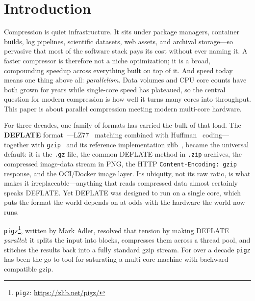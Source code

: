 \documentclass{pigzpp-whitepaper}
\begin{document}
\section{Introduction}
Compression is quiet infrastructure. It sits under package managers, container
builds, log pipelines, scientific datasets, web assets, and archival storage---so
pervasive that most of the software stack pays its cost without ever naming it.
A faster compressor is therefore not a niche optimization; it is a broad,
compounding speedup across everything built on top of it. And speed today means
one thing above all: \emph{parallelism}. Data volumes and CPU core counts have
both grown for years while single-core speed has plateaued, so the central
question for modern compression is how well it turns many cores into throughput.
This paper is about parallel compression meeting modern multi-core hardware.

For three decades, one family of formats has carried the bulk of that load. The
\textbf{DEFLATE} format~\citep{rfc1951}---LZ77~\citep{zivlempel1977} matching
combined with Huffman~\citep{huffman1952} coding---together with
\texttt{gzip}~\citep{rfc1952} and its reference implementation
zlib~\citep{rfc1950}, became the universal default: it is the
\texttt{.gz} file, the common DEFLATE method in \texttt{.zip} archives, the
compressed image-data stream in PNG, the HTTP \texttt{Content-Encoding: gzip}
response, and the OCI/Docker image layer. Its
ubiquity, not its raw ratio, is what makes it irreplaceable---anything that reads
compressed data almost certainly speaks DEFLATE. Yet DEFLATE was designed to run
on a single core, which puts the format the world depends on at odds with the
hardware the world now runs.

\texttt{pigz}\footnote{\texttt{pigz}: \url{https://zlib.net/pigz/}}, written by
Mark Adler, resolved that tension by making
DEFLATE \emph{parallel}: it splits the input into blocks, compresses them across
a thread pool, and stitches the results back into a fully standard gzip stream.
For over a decade \texttt{pigz} has been the go-to tool for saturating a
multi-core machine with backward-compatible gzip.
\end{document}
